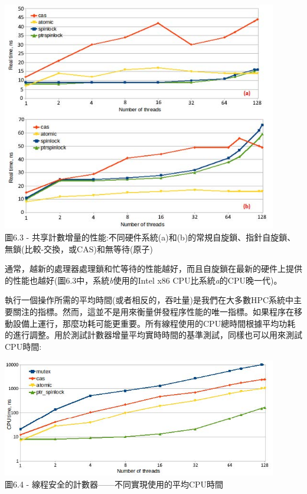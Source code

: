 \begin{center}
\includegraphics[width=0.9\textwidth]{content/2/chapter6/images/3.jpg}\\
圖6.3 - 共享計數增量的性能:不同硬件系統(a)和(b)的常規自旋鎖、指針自旋鎖、無鎖(比較-交換，或CAS)和無等待(原子)
\end{center}

通常，越新的處理器處理鎖和忙等待的性能越好，而且自旋鎖在最新的硬件上提供的性能也越好(圖6.3中，系統\textit{b}使用的Intel x86 CPU比系統\textit{a}的CPU晚一代)。

執行一個操作所需的平均時間(或者相反的，吞吐量)是我們在大多數HPC系統中主要關注的指標。然而，這並不是用來衡量併發程序性能的唯一指標。如果程序在移動設備上運行，那麼功耗可能更重要。所有線程使用的CPU總時間根據平均功耗的進行調整。用於測試計數器增量平均實時時間的基準測試，同樣也可以用來測試CPU時間:

\begin{center}
\includegraphics[width=0.9\textwidth]{content/2/chapter6/images/4.jpg}\\
圖6.4 - 線程安全的計數器——不同實現使用的平均CPU時間
\end{center}

